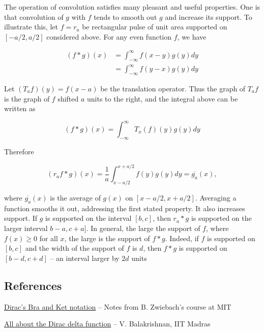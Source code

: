 The operation of convolution satisfies many pleasant and useful properties.  One is that convolution of $g$ with $f$ tends to smooth out $g$ and increase its support.
To illustrate this, let $f = r_a$ be  rectangular pulse of unit area supported on $[-a/2, a/2]$ considered above.  For any even function $f$, we have

\begin{align}
(f*g)(x) &= \int_{-\infty}^\infty  f(x - y) g(y) dy \\
 &= \int_{-\infty}^\infty  f(y -x) g(y) dy
\end{align}

Let $(T_a f)(y) = f(x-a)$ be the translation operator.  Thus the graph of $T_af$ is the graph of $f$ shifted $a$ units to the right, and the integral above can be written as

\begin{equation}
(f*g)(x) = \int_{-\infty}^\infty T_x(f)(y)g(y)  dy
\end{equation}

Therefore

\begin{equation}
(r_af*g)(x) =\frac{1}{a} \int_{x - a/2 }^{x + a/2 } f(y)g(y)  dy = \overline{g_a}(x),
\end{equation}

where $ \overline{g_a}(x) $ is the average of $g(x)$ on $[x - a/2, x + a/2]$.  Averaging a function smooths it out, addressing the first stated property.  It also increases support.  If $g$ is supported on the interval $[b,c]$, then $r_a*g$ is supported on the larger interval $b - a, c + a]$.  In general, the large the support of $f$, where $f(x) \ge 0$ for all $x$, the large is the support of $f*g$.  Indeed, if $f$ is supported on $[b,c]$ and the width of the support of $f$ is $d$, then $f*g$ is supported on $[b - d, c + d]$ -- an interval larger by $2d$ units


\subsection{References}

\href{http://ocw.mit.edu/courses/physics/8-05-quantum-physics-ii-fall-2013/lecture-notes/MIT8_05F13_Chap_04.pdf}{Dirac's Bra and Ket notation} -- Notes from B. Zwiebach's course at MIT

\href{http://www.physics.iitm.ac.in/~labs/dynamical/pedagogy/vb/delta.pdf}{All about the Dirac delta function} -- V. Balakrishnan, IIT Madras

